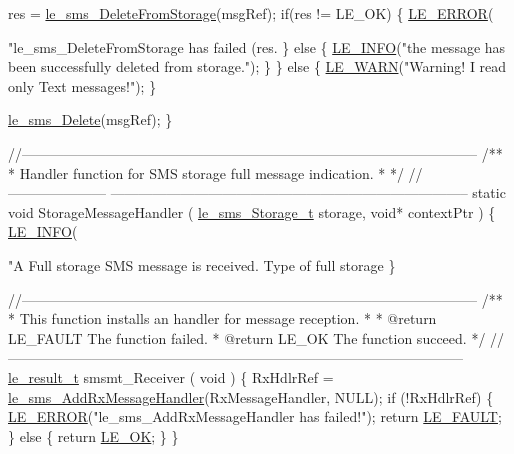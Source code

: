 \begin{DoxyCodeInclude}
{{{{{{{{{        res = \hyperlink{le__sms__interface_8h_aff755186b683b94ba2788b48e28284a3}{le\_sms\_DeleteFromStorage}(msgRef);
        \textcolor{keywordflow}{if}(res != LE\_OK)
        \{
            \hyperlink{le__log_8h_a353590f91b3143a7ba3a416ae5a50c3d}{LE\_ERROR}(\textcolor{stringliteral}{"le\_sms\_DeleteFromStorage has failed (res.%
        \}
        \textcolor{keywordflow}{else}
        \{
            \hyperlink{le__log_8h_a23e6d206faa64f612045d688cdde5808}{LE\_INFO}(\textcolor{stringliteral}{"the message has been successfully deleted from storage."});
        \}
    \}
    \textcolor{keywordflow}{else}
    \{
        \hyperlink{le__log_8h_a0201b2f60ee0e945479f91e181bf04b6}{LE\_WARN}(\textcolor{stringliteral}{"Warning! I read only Text messages!"});
    \}

    \hyperlink{le__sms__interface_8h_aca1691010c88995cb47225f2889910fa}{le\_sms\_Delete}(msgRef);
\}

\textcolor{comment}{//--------------------------------------------------------------------------------------------------}\textcolor{comment}{}
\textcolor{comment}{/**}
\textcolor{comment}{ * Handler function for SMS storage full message indication.}
\textcolor{comment}{ *}
\textcolor{comment}{ */}
\textcolor{comment}{//--------------------- -----------------------------------------------------------------------------}
\textcolor{keyword}{static} \textcolor{keywordtype}{void} StorageMessageHandler
(
    \hyperlink{le__sms__interface_8h_a3b6b0bfc35728f2a70c4eed9dbb7b995}{le\_sms\_Storage\_t}  storage,
    \textcolor{keywordtype}{void}*            contextPtr
)
\{
    \hyperlink{le__log_8h_a23e6d206faa64f612045d688cdde5808}{LE\_INFO}(\textcolor{stringliteral}{"A Full storage SMS message is received. Type of full storage %
\}


\textcolor{comment}{//--------------------------------------------------------------------------------------------------}\textcolor{comment}{}
\textcolor{comment}{/**}
\textcolor{comment}{ * This function installs an handler for message reception.}
\textcolor{comment}{ *}
\textcolor{comment}{ * @return LE\_FAULT  The function failed.}
\textcolor{comment}{ * @return LE\_OK     The function succeed.}
\textcolor{comment}{ */}
\textcolor{comment}{//--------------------------------------------------------------------------------------------------}
\hyperlink{le__basics_8h_a1cca095ed6ebab24b57a636382a6c86c}{le\_result\_t} smsmt\_Receiver
(
    \textcolor{keywordtype}{void}
)
\{
    RxHdlrRef = \hyperlink{le__sms__interface_8h_a844d595f3ae8d170b2fff80d854abb8d}{le\_sms\_AddRxMessageHandler}(RxMessageHandler, NULL);
    \textcolor{keywordflow}{if} (!RxHdlrRef)
    \{
        \hyperlink{le__log_8h_a353590f91b3143a7ba3a416ae5a50c3d}{LE\_ERROR}(\textcolor{stringliteral}{"le\_sms\_AddRxMessageHandler has failed!"});
        \textcolor{keywordflow}{return} \hyperlink{le__basics_8h_a1cca095ed6ebab24b57a636382a6c86cac409634423b6b1ef09643529f6224798}{LE\_FAULT};
    \}
    \textcolor{keywordflow}{else}
    \{
        \textcolor{keywordflow}{return} \hyperlink{le__basics_8h_a1cca095ed6ebab24b57a636382a6c86ca5066a4bcec691c6b67843b8f79656422}{LE\_OK};
    \}
\}

}}}}}}}}}}}
\end{DoxyCodeInclude}
